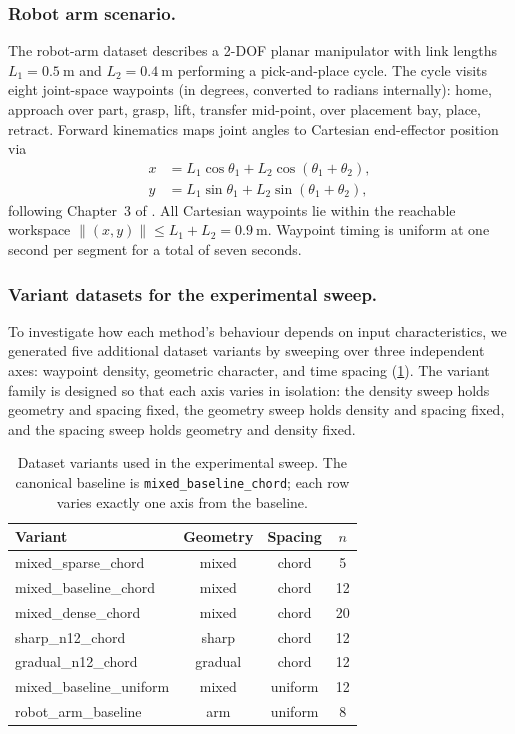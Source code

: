 \subsubsection{Robot arm scenario.}
The robot-arm dataset describes a 2-DOF planar manipulator with link
lengths $L_1 = \SI{0.5}{\meter}$ and $L_2 = \SI{0.4}{\meter}$
performing a pick-and-place cycle. The cycle visits eight joint-space
waypoints (in degrees, converted to radians internally): home,
approach over part, grasp, lift, transfer mid-point, over placement
bay, place, retract. Forward kinematics maps joint angles to
Cartesian end-effector position via
\begin{align}
x &= L_1 \cos\theta_1 + L_2 \cos(\theta_1 + \theta_2),\\
y &= L_1 \sin\theta_1 + L_2 \sin(\theta_1 + \theta_2),
\end{align}
following Chapter~3 of \cite{craig2018}. All Cartesian waypoints lie
within the reachable workspace $\|(x,y)\| \le L_1 + L_2 = \SI{0.9}{\meter}$.
Waypoint timing is uniform at one second per segment for a total of
seven seconds.

\subsubsection{Variant datasets for the experimental sweep.}
To investigate how each method's behaviour depends on input
characteristics, we generated five additional dataset variants by
sweeping over three independent axes: waypoint density, geometric
character, and time spacing
(\cref{tab:variant-summary}). The variant family is designed so that
each axis varies in isolation: the density sweep holds geometry and
spacing fixed, the geometry sweep holds density and spacing fixed,
and the spacing sweep holds geometry and density fixed.

\begin{table}[!t]
\centering
\caption{Dataset variants used in the experimental sweep. The
canonical baseline is \texttt{mixed\_baseline\_chord}; each row
varies exactly one axis from the baseline.}
\label{tab:variant-summary}
\begin{tabular}{lccc}
\toprule
\textbf{Variant} & \textbf{Geometry} & \textbf{Spacing} & \textbf{$n$} \\
\midrule
mixed\_sparse\_chord       & mixed   & chord   &  5 \\
mixed\_baseline\_chord     & mixed   & chord   & 12 \\
mixed\_dense\_chord        & mixed   & chord   & 20 \\
sharp\_n12\_chord          & sharp   & chord   & 12 \\
gradual\_n12\_chord        & gradual & chord   & 12 \\
mixed\_baseline\_uniform   & mixed   & uniform & 12 \\
robot\_arm\_baseline       & arm     & uniform &  8 \\
\bottomrule
\end{tabular}
\end{table}

